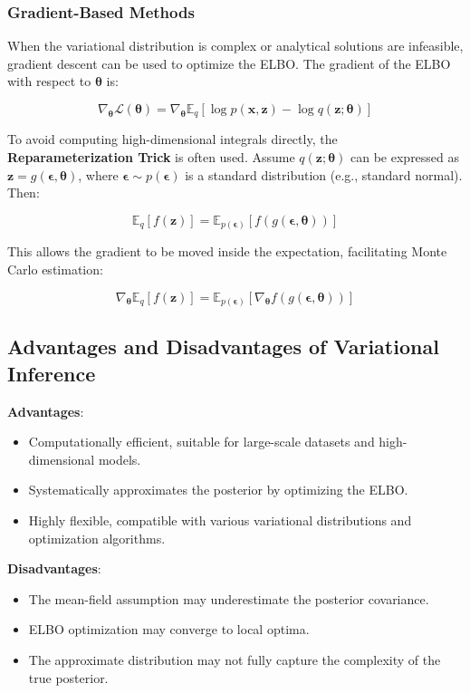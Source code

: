 \documentclass[10pt]{elegantbook}
\begin{document}
\subsubsection{Gradient-Based Methods}

When the variational distribution is complex or analytical solutions are infeasible, gradient descent can be used to optimize the ELBO. The gradient of the ELBO with respect to \( \boldsymbol{\theta} \) is:

\[
\nabla_{\boldsymbol{\theta}} \mathcal{L}(\boldsymbol{\theta}) = \nabla_{\boldsymbol{\theta}} \mathbb{E}_q [\log p(\mathbf{x}, \mathbf{z}) - \log q(\mathbf{z}; \boldsymbol{\theta})]
\]

To avoid computing high-dimensional integrals directly, the \textbf{Reparameterization Trick} is often used. Assume \( q(\mathbf{z}; \boldsymbol{\theta}) \) can be expressed as \( \mathbf{z} = g(\boldsymbol{\epsilon}, \boldsymbol{\theta}) \), where \( \boldsymbol{\epsilon} \sim p(\boldsymbol{\epsilon}) \) is a standard distribution (e.g., standard normal). Then:

\[
\mathbb{E}_q [f(\mathbf{z})] = \mathbb{E}_{p(\boldsymbol{\epsilon})} [f(g(\boldsymbol{\epsilon}, \boldsymbol{\theta}))]
\]

This allows the gradient to be moved inside the expectation, facilitating Monte Carlo estimation:

\[
\nabla_{\boldsymbol{\theta}} \mathbb{E}_q [f(\mathbf{z})] = \mathbb{E}_{p(\boldsymbol{\epsilon})} [\nabla_{\boldsymbol{\theta}} f(g(\boldsymbol{\epsilon}, \boldsymbol{\theta}))]
\]

\subsection{Advantages and Disadvantages of Variational Inference}

\textbf{Advantages}:
\begin{itemize}
    \item Computationally efficient, suitable for large-scale datasets and high-dimensional models.
    \item Systematically approximates the posterior by optimizing the ELBO.
    \item Highly flexible, compatible with various variational distributions and optimization algorithms.
\end{itemize}

\textbf{Disadvantages}:
\begin{itemize}
    \item The mean-field assumption may underestimate the posterior covariance.
    \item ELBO optimization may converge to local optima.
    \item The approximate distribution may not fully capture the complexity of the true posterior.
\end{itemize}
\end{document}
